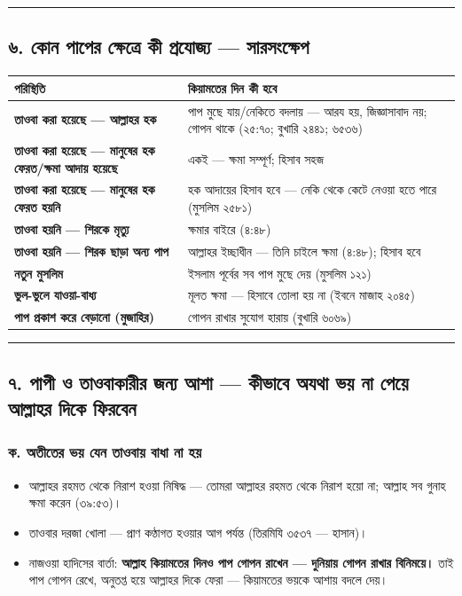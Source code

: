 \medskip\hrule\medskip

\subsection*{৬. কোন পাপের ক্ষেত্রে কী প্রযোজ্য — সারসংক্ষেপ}

\begin{table}[h]\centering\small
\begin{tabular}{ll}
পরিস্থিতি & কিয়ামতের দিন কী হবে \\
\hline
\textbf{তাওবা করা হয়েছে — আল্লাহর হক} & পাপ মুছে যায়/নেকিতে বদলায় — আরয হয়, জিজ্ঞাসাবাদ নয়; গোপন থাকে (২৫:৭০; বুখারি ২৪৪১; ৬৫৩৬) \\
\textbf{তাওবা করা হয়েছে — মানুষের হক ফেরত/ক্ষমা আদায় হয়েছে} & একই — ক্ষমা সম্পূর্ণ; হিসাব সহজ \\
\textbf{তাওবা করা হয়েছে — মানুষের হক ফেরত হয়নি} & হক আদায়ের হিসাব হবে — নেকি থেকে কেটে নেওয়া হতে পারে (মুসলিম ২৫৮১) \\
\textbf{তাওবা হয়নি — শিরকে মৃত্যু} & ক্ষমার বাইরে (৪:৪৮) \\
\textbf{তাওবা হয়নি — শিরক ছাড়া অন্য পাপ} & আল্লাহর ইচ্ছাধীন — তিনি চাইলে ক্ষমা (৪:৪৮); হিসাব হবে \\
\textbf{নতুন মুসলিম} & ইসলাম পূর্বের সব পাপ মুছে দেয় (মুসলিম ১২১) \\
\textbf{ভুল-ভুলে যাওয়া-বাধ্য} & মূলত ক্ষমা — হিসাবে তোলা হয় না (ইবনে মাজাহ ২০৪৫) \\
\textbf{পাপ প্রকাশ করে বেড়ানো (মুজাহির)} & গোপন রাখার সুযোগ হারায় (বুখারি ৬০৬৯) \\
\hline
\end{tabular}
\end{table}

\medskip\hrule\medskip

\subsection*{৭. পাপী ও তাওবাকারীর জন্য আশা — কীভাবে অযথা ভয় না পেয়ে আল্লাহর দিকে ফিরবেন}

\subsubsection*{ক. অতীতের ভয় যেন তাওবায় বাধা না হয়}

\begin{itemize}
\item আল্লাহর রহমত থেকে নিরাশ হওয়া নিষিদ্ধ — তোমরা আল্লাহর রহমত থেকে নিরাশ হয়ো না; আল্লাহ সব গুনাহ ক্ষমা করেন (৩৯:৫৩)।
\item তাওবার দরজা খোলা — প্রাণ কণ্ঠাগত হওয়ার আগ পর্যন্ত (তিরমিযি ৩৫৩৭ — হাসান)।
\item নাজওয়া হাদিসের বার্তা: \textbf{আল্লাহ কিয়ামতের দিনও পাপ গোপন রাখেন — দুনিয়ায় গোপন রাখার বিনিময়ে।} তাই পাপ গোপন রেখে, অনুতপ্ত হয়ে আল্লাহর দিকে ফেরা — কিয়ামতের ভয়কে আশায় বদলে দেয়।
\end{itemize}
